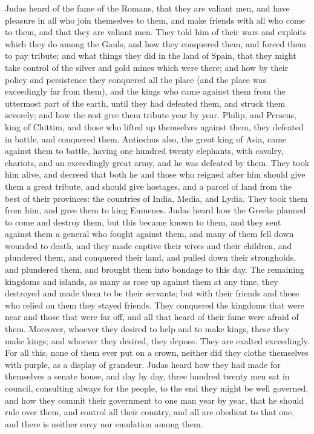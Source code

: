  Judas heard of the fame of the Romans, that they are
valiant men, and have pleasure in all who join themselves to them, and
make friends with all who come to them,  and that they are
valiant men. They told him of their wars and exploits which they do
among the Gauls, and how they conquered them, and forced them to pay
tribute;  and what things they did in the land of Spain,
that they might take control of the silver and gold mines which were
there;  and how by their policy and persistence they
conquered all the place (and the place was exceedingly far from them),
and the kings who came against them from the uttermost part of the
earth, until they had defeated them, and struck them severely; and how
the rest give them tribute year by year.  Philip, and
Perseus, king of Chittim, and those who lifted up themselves against
them, they defeated in battle, and conquered them. 
Antiochus also, the great king of Asia, came against them to battle,
having one hundred twenty elephants, with cavalry, chariots, and an
exceedingly great army, and he was defeated by them.  They
took him alive, and decreed that both he and those who reigned after him
should give them a great tribute, and should give hostages, and a parcel
of land from the best of their provinces:  the countries
of India, Media, and Lydia. They took them from him, and gave them to
king Eumenes.  Judas heard how the Greeks planned to come
and destroy them,  but this became known to them, and
they sent against them a general who fought against them, and many of
them fell down wounded to death, and they made captive their wives and
their children, and plundered them, and conquered their land, and pulled
down their strongholds, and plundered them, and brought them into
bondage to this day.  The remaining kingdoms and islands,
as many as rose up against them at any time, they destroyed and made
them to be their servants;  but with their friends and
those who relied on them they stayed friends. They conquered the
kingdoms that were near and those that were far off, and all that heard
of their fame were afraid of them.  Moreover, whoever
they desired to help and to make kings, these they make kings; and
whoever they desired, they depose. They are exalted exceedingly.
 For all this, none of them ever put on a crown, neither
did they clothe themselves with purple, as a display of grandeur.
 Judas heard how they had made for themselves a senate
house, and day by day, three hundred twenty men sat in council,
consulting always for the people, to the end they might be well
governed,  and how they commit their government to one
man year by year, that he should rule over them, and control all their
country, and all are obedient to that one, and there is neither envy nor
emulation among them.

